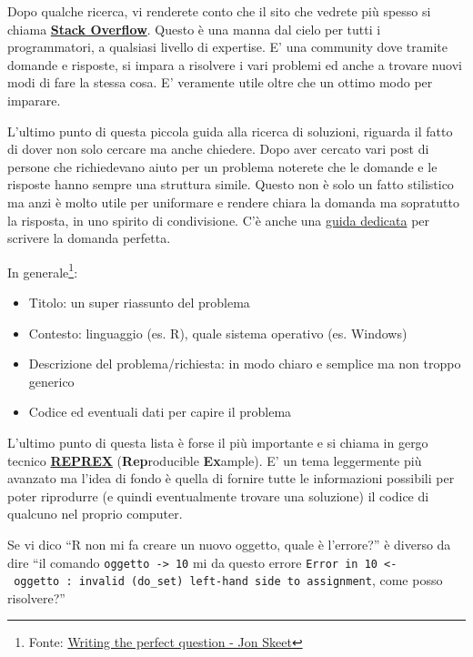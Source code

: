 \documentclass[
]{book}
\providecommand{\tightlist}{%
  \setlength{\itemsep}{0pt}\setlength{\parskip}{0pt}}
\begin{document}
Dopo qualche ricerca, vi renderete conto che il sito che vedrete più spesso si chiama \href{https://stackoverflow.com/}{\textbf{Stack Overflow}}. Questo è una manna dal cielo per tutti i programmatori, a qualsiasi livello di expertise. E' una community dove tramite domande e risposte, si impara a risolvere i vari problemi ed anche a trovare nuovi modi di fare la stessa cosa. E' veramente utile oltre che un ottimo modo per imparare.

L'ultimo punto di questa piccola guida alla ricerca di soluzioni, riguarda il fatto di dover non solo cercare ma anche chiedere. Dopo aver cercato vari post di persone che richiedevano aiuto per un problema noterete che le domande e le risposte hanno sempre una struttura simile. Questo non è solo un fatto stilistico ma anzi è molto utile per uniformare e rendere chiara la domanda ma sopratutto la risposta, in uno spirito di condivisione. C'è anche una \href{https://stackoverflow.com/help/how-to-ask}{guida dedicata} per scrivere la domanda perfetta.

In generale\footnote{Fonte: \href{https://codeblog.jonskeet.uk/2010/08/29/writing-the-perfect-question/}{Writing the perfect question - Jon Skeet}}:

\begin{itemize}
\tightlist
\item
  Titolo: un super riassunto del problema
\item
  Contesto: linguaggio (es. R), quale sistema operativo (es. Windows)
\item
  Descrizione del problema/richiesta: in modo chiaro e semplice ma non troppo generico
\item
  Codice ed eventuali dati per capire il problema
\end{itemize}

L'ultimo punto di questa lista è forse il più importante e si chiama in gergo tecnico \href{https://community.rstudio.com/t/faq-whats-a-reproducible-example-reprex-and-how-do-i-create-one/5219}{\textbf{REPREX}} (\textbf{Rep}roducible \textbf{Ex}ample). E' un tema leggermente più avanzato ma l'idea di fondo è quella di fornire tutte le informazioni possibili per poter riprodurre (e quindi eventualmente trovare una soluzione) il codice di qualcuno nel proprio computer.

Se vi dico ``R non mi fa creare un nuovo oggetto, quale è l'errore?'' è diverso da dire ``il comando \texttt{oggetto\ -\textgreater{}\ 10} mi da questo errore \texttt{Error\ in\ 10\ \textless{}-\ oggetto\ :\ invalid\ (do\_set)\ left-hand\ side\ to\ assignment}, come posso risolvere?''
\end{document}
